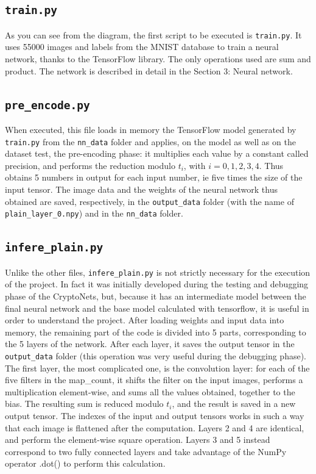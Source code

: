 \subsection{\texttt{train.py}}

As you can see from the diagram, the first script to be executed is \texttt{train.py}. It uses 55000 images and labels from the MNIST database to train a neural network, thanks to the TensorFlow library. The only operations used are sum and product. The network is described in detail in the Section 3: Neural network.

\subsection{\texttt{pre_encode.py}}

When executed, this file loads in memory the TensorFlow model generated by \texttt{train.py} from the \texttt{nn_data} folder and applies, on the model as well as on the dataset test, the pre-encoding phase: it multiplies each value by a constant called precision, and performs the reduction modulo $t_i$, with $i = 0,1,2,3,4$. Thus obtains 5 numbers in output for each input number, ie five times the size of the input tensor. The image data and the weights of the neural network thus obtained are saved, respectively, in the \texttt{output_data} folder (with the name of \texttt{plain_layer_0.npy}) and in the \texttt{nn_data} folder.

\subsection{\texttt{infere_plain.py}}

Unlike the other files, \texttt{infere_plain.py} is not strictly necessary for the execution of the project. In fact it was initially developed during the testing and debugging phase of the CryptoNets, but, because it has an intermediate model between the final neural network and the base model calculated with tensorflow, it is useful in order to understand the project. After loading weights and input data into memory, the remaining part of the code is divided into 5 parts, corresponding to the 5 layers of the network. After each layer, it saves the output tensor in the \texttt{output_data} folder (this operation was very useful during the debugging phase). The first layer, the most complicated one, is the convolution layer: for each of the five filters in the map_count, it shifts the filter on the input images, performs a multiplication element-wise, and sums all the values obtained, together to the bias. The resulting sum is reduced modulo $t_i$, and the result is saved in a new output tensor. The indexes of the input and output tensors works in such a way that each image is flattened after the computation. Layers 2 and 4 are identical, and perform the element-wise square operation. Layers 3 and 5 instead correspond to two fully connected layers and take advantage of the NumPy operator .dot() to perform this calculation.

